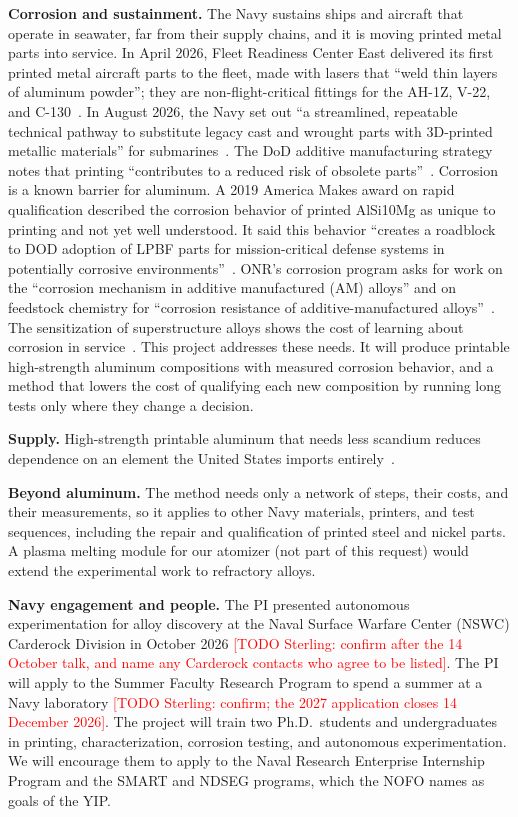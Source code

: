 \documentclass[12pt,letterpaper]{article}
\newcommand{\todo}[1]{\textcolor{red}{[TODO Sterling: #1]}}
\begin{document}
\textbf{Corrosion and sustainment.} The Navy sustains ships and aircraft that
operate in seawater, far from their supply chains, and it is moving printed
metal parts into service. In April 2026, Fleet Readiness Center East
delivered its first printed metal aircraft parts to the fleet, made with
lasers that ``weld thin layers of aluminum powder''; they are
non-flight-critical fittings for the AH-1Z, V-22, and
C-130~\cite{frce2026}. In August 2026, the Navy set out ``a streamlined,
repeatable technical pathway to substitute legacy cast and wrought parts with
3D-printed metallic materials'' for submarines~\cite{navy2026ppd}. The DoD
additive manufacturing strategy notes that printing ``contributes to a
reduced risk of obsolete parts''~\cite{dodam2021}. Corrosion is a known
barrier for aluminum. A 2019 America Makes award on rapid qualification
described the corrosion behavior of printed AlSi10Mg as unique to printing
and not yet well understood. It said this behavior ``creates a roadblock to
DOD adoption of LPBF parts for mission-critical defense systems in
potentially corrosive environments''~\cite{americamakes2019}. ONR's
corrosion program asks for work on the ``corrosion mechanism in additive
manufactured (AM) alloys'' and on feedstock chemistry for ``corrosion
resistance of additive-manufactured alloys''~\cite{onrcorr}. The
sensitization of superstructure alloys shows the cost of learning about
corrosion in service~\cite{golumbfskie2016}. This project addresses these
needs. It will produce printable high-strength aluminum compositions with
measured corrosion behavior, and a method that lowers the cost of qualifying
each new composition by running long tests only where they change a
decision.

\textbf{Supply.} High-strength printable aluminum that needs less scandium
reduces dependence on an element the United States imports
entirely~\cite{usgs2026sc}.

\textbf{Beyond aluminum.} The method needs only a network of steps, their
costs, and their measurements, so it applies to other Navy materials,
printers, and test sequences, including the repair and qualification of
printed steel and nickel parts. A plasma melting module for our atomizer (not
part of this request) would extend the experimental work to refractory alloys.

\textbf{Navy engagement and people.} The PI presented autonomous
experimentation for alloy discovery at the Naval Surface Warfare Center
(NSWC) Carderock Division in October 2026 \todo{confirm after the 14 October
talk, and name any Carderock contacts who agree to be listed}. The PI will
apply to the Summer Faculty Research Program to spend a summer at a Navy
laboratory \todo{confirm; the 2027 application closes 14 December 2026}. The
project will train two Ph.D.\ students and undergraduates in printing,
characterization, corrosion testing, and autonomous experimentation. We will
encourage them to apply to the Naval Research Enterprise Internship Program
and the SMART and NDSEG programs, which the NOFO names as goals of the YIP.
\end{document}
